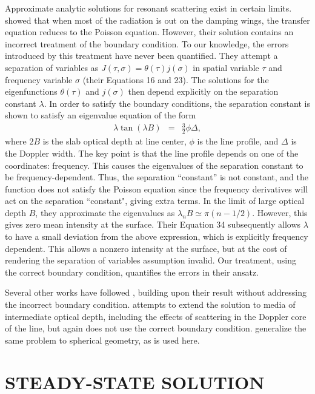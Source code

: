 \documentclass[linenumbers]{aastex63}
\newcommand{\be}{\begin{eqnarray}}
\newcommand{\ee}{\end{eqnarray}}
\begin{document}
Approximate analytic solutions for resonant scattering exist in certain limits. \citet{1973MNRAS.162...43H} showed that when most of the radiation is out on the damping wings, the transfer equation reduces to the Poisson equation. However, their solution contains an incorrect treatment of the boundary condition. To our knowledge, the errors introduced by this treatment have never been quantified. They attempt a separation of variables as $J(\tau,\sigma) = \theta(\tau) j(\sigma)$ in spatial variable $\tau$ and frequency variable $\sigma$ (their Equations 16 and 23). The solutions for the eigenfunctions $\theta(\tau)$ and $j(\sigma)$ then depend explicitly on the separation constant $\lambda$. In order to satisfy the boundary conditions, the separation constant is shown to satisfy an eigenvalue equation of the form
\be
\lambda \tan(\lambda B) & = & \frac{3}{2} \phi \Delta,
\label{eq:evalue}
\ee
where $2B$ is the slab optical depth at line center, $\phi$ is the line profile, and $\Delta$ is the Doppler width. The key point is that the line profile depends on one of the coordinates: frequency. This causes the eigenvalues of the separation constant to be frequency-dependent. Thus, the separation ``constant'' is not constant, and the function does not satisfy the Poisson equation since the frequency derivatives will act on the separation ``constant", giving extra terms. In the limit of large optical depth $B$, they approximate the eigenvalues as $\lambda_n B \simeq \pi (n-1/2)$. However, this gives zero mean intensity at the surface. Their Equation 34 subsequently allows $\lambda$ to have a small deviation from the above expression, which is explicitly frequency dependent. This allows a nonzero intensity at the surface, but at the cost of rendering the separation of variables assumption invalid. Our treatment, using the correct boundary condition, quantifies the errors in their ansatz.

Several other works have followed \citet{1973MNRAS.162...43H}, building upon their result without addressing the incorrect boundary condition. \citet{1990ApJ...350..216N} attempts to extend the solution to media of intermediate optical depth, including the effects of scattering in the Doppler core of the line, but again does not use the correct boundary condition. \citet{2006ApJ...649...14D} generalize the same problem to spherical geometry, as is used here.

\section{STEADY-STATE SOLUTION}
\label{sec:steadystate}
\end{document}
